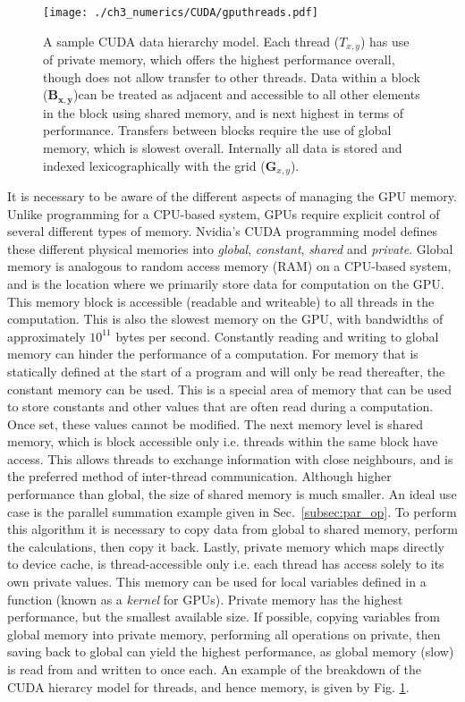 \begin{figure}[tb]
    \centering
    \texttt{[image: ./ch3\_numerics/CUDA/gputhreads.pdf]}
    \caption{A sample CUDA data hierarchy model. Each thread ($T_{x,y}$) has use of private memory, which offers the highest performance overall, though does not allow transfer to other threads. Data within a block ($\mathbf{B_{x,y}}$)can be treated as adjacent and accessible to all other elements in the block using {shared memory}, and is next highest in terms of performance. Transfers between blocks require the use of {global memory}, which is slowest overall. Internally all data is stored and indexed lexicographically with the grid ($\mathbf{G}_{x,y}$).}
    \label{fig:gpu_threads}
\end{figure}

It is necessary to be aware of the different aspects of managing the GPU memory. Unlike programming for a CPU-based system, GPUs require explicit control of several different types of memory. Nvidia's CUDA programming model defines these different physical memories into \textit{global}, \textit{constant}, \textit{shared} and \textit{private}. Global memory is analogous to random access memory (RAM) on a CPU-based system, and is the location where we primarily store data for computation on the GPU. This memory block is accessible (readable and writeable) to all threads in the computation. This is also the slowest memory on the GPU, with bandwidths of approximately $10^{11}$ bytes per second. Constantly reading and writing to global memory can hinder the performance of a computation. For memory that is statically defined at the start of a program and will only be read thereafter, the constant memory can be used. This is a special area of memory that can be used to store constants and other values that are often read during a computation. Once set, these values cannot be modified. The next memory level is shared memory, which is block accessible only i.e. threads within the same block have access. This allows threads to exchange information with close neighbours, and is the preferred method of inter-thread communication. Although higher performance than global, the size of shared memory is much smaller. An ideal use case is the parallel summation example given in Sec.~\ref{subsec:par_op}. To perform this algorithm it is necessary to copy data from global to shared memory, perform the calculations, then copy it back. Lastly, private memory which maps directly to device cache, is thread-accessible only i.e. each thread has access solely to its own private values. This memory can be used for local variables defined in a function (known as a \textit{kernel} for GPUs). Private memory has the highest performance, but the smallest available size. If possible, copying variables from global memory into private memory, performing all operations on private, then saving back to global can yield the highest performance, as global memory (slow) is read from and written to once each. An example of the breakdown of the CUDA hierarcy model for threads, and hence memory, is given by Fig. \ref{fig:gpu_threads}.

